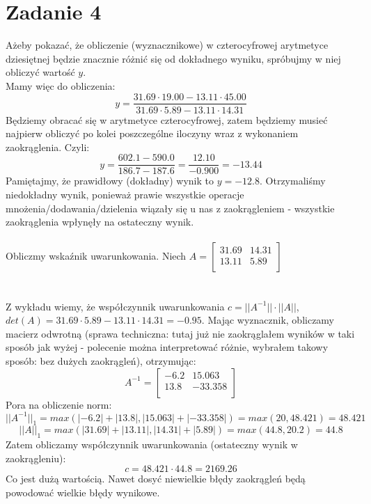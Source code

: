 \documentclass{article}
\begin{document}
\section*{Zadanie 4}
Ażeby pokazać, że obliczenie (wyznacznikowe) w czterocyfrowej arytmetyce dziesiętnej będzie znacznie różnić się od dokładnego wyniku, spróbujmy w niej obliczyć wartość $y$. \\
Mamy więc do obliczenia: 
$$y = \frac{31.69 \cdot 19.00 - 13.11 \cdot 45.00}{31.69 \cdot 5.89 - 13.11 \cdot 14.31}$$
Będziemy obracać się w arytmetyce czterocyfrowej, zatem będziemy musieć najpierw obliczyć po kolei poszczególne iloczyny wraz z wykonaniem zaokrąglenia. Czyli:
$$y = \frac{602.1 - 590.0}{186.7 - 187.6} = \frac{12.10}{-0.900} = -13.44$$
Pamiętajmy, że prawidłowy (dokładny) wynik to $y = -12.8$. Otrzymaliśmy niedokładny wynik, ponieważ prawie wszystkie operacje mnożenia/dodawania/dzielenia wiązały się u nas z zaokrągleniem - wszystkie zaokrąglenia wpłynęły na ostateczny wynik. \\ \\
Obliczmy wskaźnik uwarunkowania.
Niech $A = \left[ \begin{array}{cc}
31.69 & 14.31 \\
13.11 & 5.89 \\
\end{array} \right]$ \\ \\ \\
Z wykładu wiemy, że współczynnik uwarunkowania $c = ||A^{-1}|| \cdot ||A||$, \\ $det(A) = 31.69 \cdot 5.89 - 13.11 \cdot 14.31 = -0.95$. Mając wyznacznik, obliczamy macierz odwrotną (sprawa techniczna: tutaj już nie zaokrąglałem wyników w taki sposób jak wyżej - polecenie można interpretować różnie, wybrałem takowy sposób: bez dużych zaokrągleń), otrzymując:
$$A^{-1} = \left[ \begin{array}{cc}
-6.2 & 15.063 \\
13.8 & -33.358 \\
\end{array} \right]$$
Pora na obliczenie norm:
$$||A^{-1}||_1 = max(|-6.2|+|13.8|, |15.063|+|-33.358|) = max(20, 48.421) = 48.421$$
$$||A||_1 = max(|31.69|+|13.11|, |14.31|+|5.89|) = max(44.8, 20.2) = 44.8$$
Zatem obliczamy współczynnik uwarunkowania (ostateczny wynik w zaokrągleniu):
$$c = 48.421 \cdot 44.8 = 2169.26$$
Co jest dużą wartością. Nawet dosyć niewielkie błędy zaokrągleń będą powodować wielkie błędy wynikowe.
\end{document}
